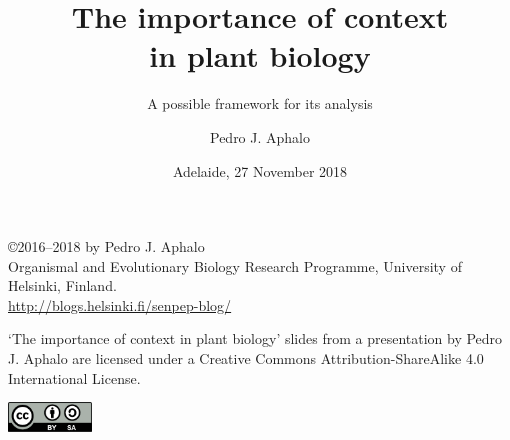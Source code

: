 \documentclass[10pt]{beamer}\usepackage[]{graphicx}\usepackage[]{xcolor}
\begin{document}

\title{The importance of context\\in plant biology}
\subtitle{A possible framework for its analysis}
\author{Pedro J. Aphalo}
\date{Adelaide, 27 November 2018}


	\begin{frame}
		\maketitle
	\end{frame}

	\begin{frame}[c]
		\begin{center}
			\begin{small}
				\copyright 2016--2018 by Pedro J. Aphalo\\
				Organismal and Evolutionary Biology Research Programme, University of Helsinki, Finland.\\
				\textcolor{blue}{\url{http://blogs.helsinki.fi/senpep-blog/}}\\[2ex]
			\end{small}

			\begin{footnotesize}
				`The importance of context in plant biology' slides from a presentation by Pedro J. Aphalo are licensed under a Creative Commons Attribution-ShareAlike 4.0 International License.\\[2ex]

			\end{footnotesize}

			\includegraphics[width=6em]{figures/by-sa}
		\end{center}
	\end{frame}
\end{document}

